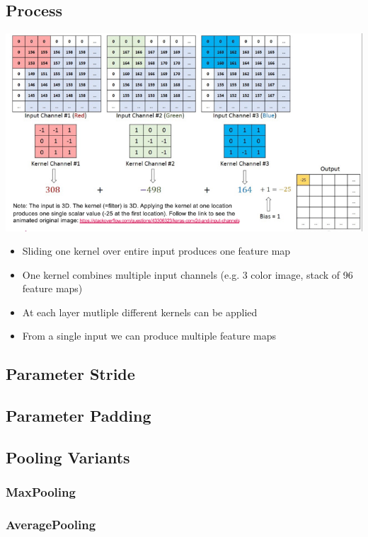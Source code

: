 \documentclass[a4paper, landscape, 10pt]{scrartcl}
\begin{document}
\begin{multicols*}{3}
        \subsection{Process}
        \includegraphics[width=\columnwidth]{graphic/01-convolution}
        \begin{itemize}
            \item Sliding one kernel over entire input produces one feature map
            \item One kernel combines multiple input channels (e.g. 3 color image, stack of 96 feature maps)
            \item At each layer mutliple different kernels can be applied
            \item From a single input we can produce multiple feature maps
        \end{itemize}

        \subsection{Parameter Stride}

        \subsection{Parameter Padding}

        \subsection{Pooling Variants}
        \subsubsection{MaxPooling}
        \subsubsection{AveragePooling}
        

\end{multicols*}
\end{document}
